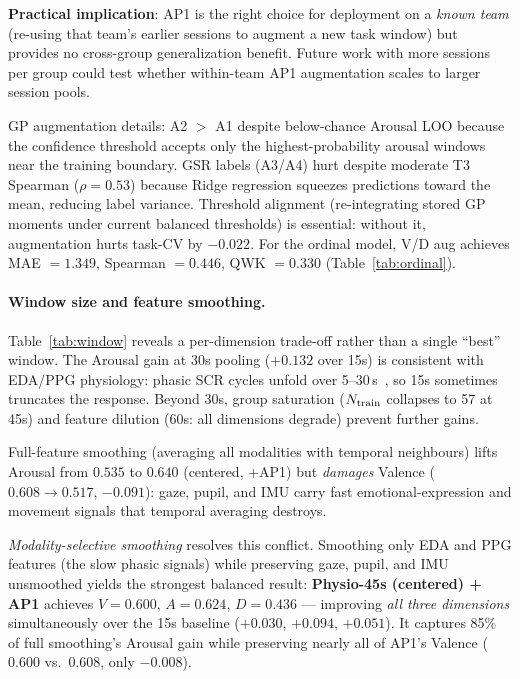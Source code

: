 \documentclass[sigconf,review,anonymous]{acmart}
\begin{document}
\textbf{Practical implication}: AP1 is the right choice for deployment on a
\emph{known team} (re-using that team's earlier sessions to augment a new task
window) but provides no cross-group generalization benefit.
Future work with more sessions per group could test whether within-team AP1
augmentation scales to larger session pools.

GP augmentation details: A2 $>$ A1 despite below-chance Arousal LOO because the
confidence threshold accepts only the highest-probability arousal windows near
the training boundary.
GSR labels (A3/A4) hurt despite moderate T3 Spearman ($\rho{=}0.53$) because
Ridge regression squeezes predictions toward the mean, reducing label variance.
Threshold alignment (re-integrating stored GP moments under current balanced
thresholds) is essential: without it, augmentation hurts task-CV by $-0.022$.
For the ordinal model, V/D aug achieves MAE $=1.349$, Spearman $=0.446$, QWK $=0.330$
(Table~\ref{tab:ordinal}).

\paragraph{Window size and feature smoothing.}
Table~\ref{tab:window} reveals a per-dimension trade-off rather than a single
``best'' window.
The Arousal gain at 30s pooling ($+0.132$ over 15s) is consistent with EDA/PPG
physiology: phasic SCR cycles unfold over
5--30\,s~\cite{kreibig2010autonomic}, so 15s sometimes truncates the response.
Beyond 30s, group saturation ($N_{\rm train}$ collapses to 57 at 45s)
and feature dilution (60s: all dimensions degrade) prevent further gains.

Full-feature smoothing (averaging all modalities with temporal neighbours)
lifts Arousal from $0.535$ to $0.640$ (centered, +AP1) but \emph{damages}
Valence ($0.608 \to 0.517$, $-0.091$): gaze, pupil, and IMU carry fast
emotional-expression and movement signals that temporal averaging destroys.

\textit{Modality-selective smoothing} resolves this conflict.
Smoothing only EDA and PPG features (the slow phasic signals) while preserving
gaze, pupil, and IMU unsmoothed yields the strongest balanced result:
\textbf{Physio-45s (centered) + AP1} achieves $V{=}0.600$, $A{=}0.624$,
$D{=}0.436$ --- improving \emph{all three dimensions} simultaneously over
the 15s baseline ($+0.030$, $+0.094$, $+0.051$).
It captures 85\% of full smoothing's Arousal gain while preserving nearly all
of AP1's Valence ($0.600$ vs.\ $0.608$, only $-0.008$).
\end{document}
